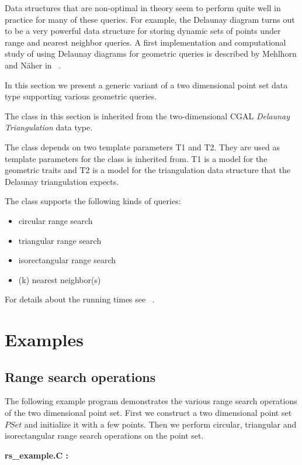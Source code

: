 Data structures that are non-optimal in theory seem to perform quite well in
practice for many of these queries.
For example, the Delaunay diagram turns out to be a very powerful
data structure for storing dynamic sets of points under range and nearest
neighbor queries. A first implementation and computational
study of using Delaunay diagrams for geometric queries is described by
Mehlhorn and N\"aher in ~\cite{LEDAbook}.

In this section we present a generic variant of a two dimensional point set
data type supporting various geometric queries.

The  class in this section is inherited
from the two-dimensional CGAL {\em Delaunay Triangulation} data type.

The  class depends on two template parameters T1 and T2.
They are used as template parameters for the 
class  is inherited from. T1 is a model for the
geometric traits and T2 is a model for the triangulation data structure that the Delaunay triangulation
expects.

The  class supports the following kinds of queries:
\begin{itemize}
\item circular range search
\item triangular range search
\item isorectangular range search
\item (k) nearest neighbor(s)
\end{itemize}
For details about the running times see ~\cite{LEDAbook}.

\section{Examples}

\subsection{Range search operations}

The following example program demonstrates the various range search operations
of the two dimensional point set.
First we construct a two dimensional point set $PSet$ and initialize it with a few points.
Then we perform circular, triangular and isorectangular range search operations on the
point set.

\ccHtmlLinksOff

{\bf rs\_example.C :}


\ccHtmlLinksOn

